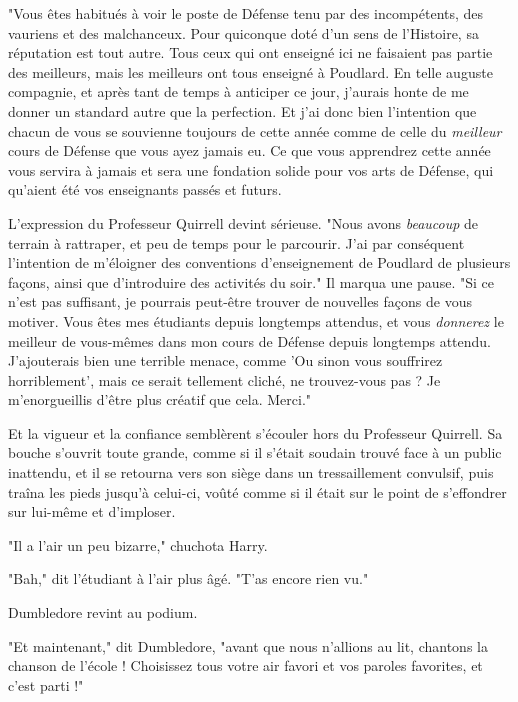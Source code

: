 "Vous êtes habitués à voir le poste de Défense tenu par des incompétents, des vauriens et des malchanceux. Pour quiconque doté d'un sens de l'Histoire, sa réputation est tout autre. Tous ceux qui ont enseigné ici ne faisaient pas partie des meilleurs, mais les meilleurs ont tous enseigné à Poudlard. En telle auguste compagnie, et après tant de temps à anticiper ce jour, j'aurais honte de me donner un standard autre que la perfection. Et j'ai donc bien l'intention que chacun de vous se souvienne toujours de cette année comme de celle du \emph{meilleur}  cours de Défense que vous ayez jamais eu. Ce que vous apprendrez cette année vous servira à jamais et sera une fondation solide pour vos arts de Défense, qui qu'aient été vos enseignants passés et futurs.

L'expression du Professeur Quirrell devint sérieuse. "Nous avons \emph{beaucoup}  de terrain à rattraper, et peu de temps pour le parcourir. J'ai par conséquent l'intention de m'éloigner des conventions d'enseignement de Poudlard de plusieurs façons, ainsi que d'introduire des activités du soir." Il marqua une pause. "Si ce n'est pas suffisant, je pourrais peut-être trouver de nouvelles façons de vous motiver. Vous êtes mes étudiants depuis longtemps attendus, et vous \emph{donnerez}  le meilleur de vous-mêmes dans mon cours de Défense depuis longtemps attendu. J'ajouterais bien une terrible menace, comme 'Ou sinon vous souffrirez horriblement', mais ce serait tellement cliché, ne trouvez-vous pas ? Je m'enorgueillis d'être plus créatif que cela. Merci."

Et la vigueur et la confiance semblèrent s'écouler hors du Professeur Quirrell. Sa bouche s'ouvrit toute grande, comme si il s'était soudain trouvé face à un public inattendu, et il se retourna vers son siège dans un tressaillement convulsif, puis traîna les pieds jusqu'à celui-ci, voûté comme si il était sur le point de s'effondrer sur lui-même et d'imploser.

"Il a l'air un peu bizarre," chuchota Harry.

"Bah," dit l'étudiant à l'air plus âgé. "T'as encore rien vu."

Dumbledore revint au podium.

"Et maintenant," dit Dumbledore, "avant que nous n'allions au lit, chantons la chanson de l'école ! Choisissez tous votre air favori et vos paroles favorites, et c'est parti !"

